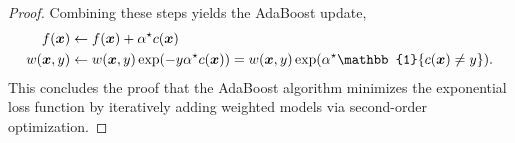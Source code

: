 \begin{proof}
    Combining these steps yields the AdaBoost update,
    \begin{align*}
        f(\vec{x})    & \gets f(\vec{x}) + \alpha^\star c(\vec{x})                                                                                            \\
        w(\vec{x}, y) & \gets w(\vec{x}, y) \exp(-y \alpha^\star c(\vec{x})) = w(\vec{x}, y) \exp \lft( \alpha^\star \mathbb{1}\{ c(\vec{x}) \neq y \} \rgt).
    \end{align*}
    This concludes the proof that the AdaBoost algorithm minimizes the exponential loss function by
    iteratively adding weighted models via second-order optimization.
\end{proof}
